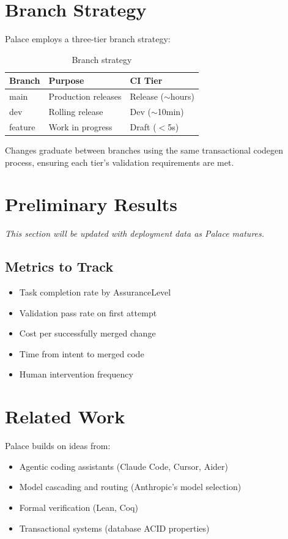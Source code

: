 \documentclass[11pt,a4paper]{article}
\begin{document}
\section{Branch Strategy}

Palace employs a three-tier branch strategy:

\begin{table}[h]
\centering
\begin{tabular}{lll}
\toprule
\textbf{Branch} & \textbf{Purpose} & \textbf{CI Tier} \\
\midrule
main & Production releases & Release ($\sim$hours) \\
dev & Rolling release & Dev ($\sim$10min) \\
feature & Work in progress & Draft ($<$5s) \\
\bottomrule
\end{tabular}
\caption{Branch strategy}
\label{tab:branches}
\end{table}

Changes graduate between branches using the same transactional codegen process,
ensuring each tier's validation requirements are met.

\section{Preliminary Results}

\textit{This section will be updated with deployment data as Palace matures.}

\subsection{Metrics to Track}

\begin{itemize}
    \item Task completion rate by AssuranceLevel
    \item Validation pass rate on first attempt
    \item Cost per successfully merged change
    \item Time from intent to merged code
    \item Human intervention frequency
\end{itemize}

\section{Related Work}

Palace builds on ideas from:
\begin{itemize}
    \item Agentic coding assistants (Claude Code, Cursor, Aider)
    \item Model cascading and routing (Anthropic's model selection)
    \item Formal verification (Lean, Coq)
    \item Transactional systems (database ACID properties)
\end{itemize}
\end{document}
